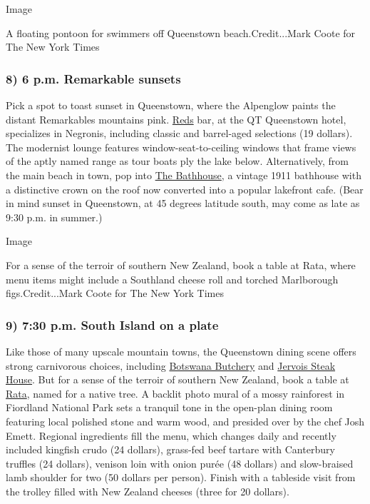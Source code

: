 Image

A floating pontoon for swimmers off Queenstown beach.Credit...Mark Coote
for The New York Times

\hypertarget{8-6-pm-remarkable-sunsets}{%
\subsubsection{\texorpdfstring{\textbf{8) 6 p.m. Remarkable
sunsets}}{8) 6 p.m. Remarkable sunsets}}\label{8-6-pm-remarkable-sunsets}}

Pick a spot to toast sunset in Queenstown, where the Alpenglow paints
the distant Remarkables mountains pink.
\href{https://www.qthotelsandresorts.com/queenstown/eat-drink/reds/}{Reds}
bar, at the QT Queenstown hotel, specializes in Negronis, including
classic and barrel-aged selections (19 dollars). The modernist lounge
features window-seat-to-ceiling windows that frame views of the aptly
named range as tour boats ply the lake below. Alternatively, from the
main beach in town, pop into \href{https://www.bathhouse.co.nz/}{The
Bathhouse}, a vintage 1911 bathhouse with a distinctive crown on the
roof now converted into a popular lakefront cafe. (Bear in mind sunset
in Queenstown, at 45 degrees latitude south, may come as late as 9:30
p.m. in summer.)

Image

For a sense of the terroir of southern New Zealand, book a table at
Rata, where menu items might include a Southland cheese roll and torched
Marlborough figs.Credit...Mark Coote for The New York Times

\hypertarget{9-730-pm-south-island-on-a-plate}{%
\subsubsection{\texorpdfstring{\textbf{9) 7:30 p.m. South Island on a
plate}}{9) 7:30 p.m. South Island on a plate}}\label{9-730-pm-south-island-on-a-plate}}

Like those of many upscale mountain towns, the Queenstown dining scene
offers strong carnivorous choices, including
\href{https://www.botswanabutchery.co.nz/queenstown/}{Botswana Butchery}
and \href{https://www.jervoissteakhouse.co.nz/queenstown}{Jervois Steak
House}. But for a sense of the terroir of southern New Zealand, book a
table at \href{https://www.ratadining.co.nz/}{Rata}, named for a native
tree. A backlit photo mural of a mossy rainforest in Fiordland National
Park sets a tranquil tone in the open-plan dining room featuring local
polished stone and warm wood, and presided over by the chef Josh Emett.
Regional ingredients fill the menu, which changes daily and recently
included kingfish crudo (24 dollars), grass-fed beef tartare with
Canterbury truffles (24 dollars), venison loin with onion purée (48
dollars) and slow-braised lamb shoulder for two (50 dollars per person).
Finish with a tableside visit from the trolley filled with New Zealand
cheeses (three for 20 dollars).

